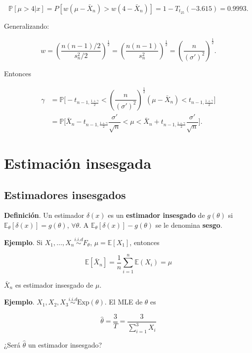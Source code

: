 \documentclass[
  12pt,
]{book}
\begin{document}
\[  
\mathbb P[\mu>4|x] = P[w(\mu-\bar X_n)>w(4-\bar X_n)]=1-T_{t_{25}}(-3.615) =
0.9993.
\]

Generalizando:

\[ 
w = \left(\dfrac{n(n-1)/2}{s_n^2/2}\right)^{\frac 12} =
\left(\dfrac{n(n-1)}{s_n^2}\right)^{\frac 12} =
\left(\dfrac{n}{(\sigma')^2}\right)^{\frac 12}.
\]

Entonces

\begin{align*}
\gamma & = \mathbb P\bigg[-t_{n-1,\frac{1+\gamma}{2}} < \left(\dfrac{n}{(\sigma')^2}\right)^{\frac 12}(\mu-\bar X_n)<t_{n-1,\frac{1+\gamma}{2}}\bigg] \\
& =  \mathbb P\bigg[\bar X_n-t_{n-1,\frac{1+\gamma}{2}}  \dfrac{\sigma'}{\sqrt n} < \mu < \bar X_n+t_{n-1,\frac{1+\gamma}{2}}  \dfrac{\sigma'}{\sqrt n}  \bigg].
\end{align*}

\hypertarget{estimaciuxf3n-insesgada}{%
\chapter{Estimación insesgada}\label{estimaciuxf3n-insesgada}}

\hypertarget{estimadores-insesgados}{%
\section{Estimadores insesgados}\label{estimadores-insesgados}}

\textbf{Definición}. Un estimador \(\delta(x)\) es un \textbf{estimador insesgado} de
\(g(\theta)\) si \(\mathbb E_{\theta}[\delta(x)] = g(\theta)\), \(\forall \theta\). A
\(\mathbb E_{\theta}[\delta(x)] - g(\theta)\) se le denomina \textbf{sesgo}.

\textbf{Ejemplo}. Si \(X_1,\dots, X_n \overset{i.i.d}{\sim} F_\theta\), \(\mu = \mathbb E[X_1]\), entonces

\[\mathbb E[\bar X_n] = \dfrac 1n \sum_{i=1}^n\mathbb E(X_i) = \mu\]

\(\bar X_n\) es estimador insesgado de \(\mu\).

\textbf{Ejemplo}. \(X_1,X_2,X_3 \overset{i.i.d}{\sim} \text{Exp}(\theta)\). El MLE de
\(\theta\) es

\[\hat\theta = \dfrac 3T = \dfrac 3{\sum_{i=1}^{3}X_i}\]

¿Será \(\hat\theta\) un estimador insesgado?
\end{document}
